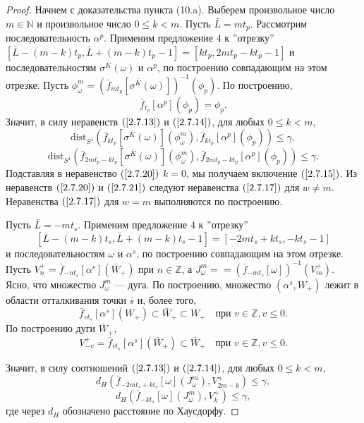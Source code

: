 \documentclass[12pt]{article}
\begin{document}
\begin{proof}
Начнем с доказательства пункта (10.a).
Выберем произвольное число $m\in\mathbb{N}$ и произвольное число $0\leq k< m$.
Пусть $\bar{L}=mt_p$.
Рассмотрим последовательность $\alpha^p$.  Применим предложение 4 к ''отрезку'' $[\bar{L}-(m-k)t_p,\bar{L}+(m-k)t_p-1]=[kt_p,2mt_p-kt_p-1]$ и последовательностям $\sigma^{\bar{K}}(\omega)$ и $\alpha^p$, по построению совпадающим на этом отрезке. Пусть $\phi^m_{\omega}=(\bar{f}_{mt_p}[\sigma^{\bar{K}}(\omega)])^{-1}(\phi_p)$. 
По построению,
$$\bar{f}_{t_p}[\alpha^p](\phi_p)=\phi_p.$$
Значит, в силу неравенств $(\ref{2.7.13})$ и $(\ref{2.7.14})$, для любых $0\leq k< m$,
\begin{equation}
\label{2.7.20}
\mbox{dist}_{S^1}(\bar{f}_{kt_p}[\sigma^{\bar{K}}(\omega)](\phi^m_{\omega}),\bar{f}_{kt_p}[\alpha^p](\phi_p))\leq\gamma,
\end{equation}
\begin{equation}
\label{2.7.21}
\mbox{dist}_{S^1}(\bar{f}_{2mt_p-kt_p}[\sigma^{\bar{K}}(\omega)](\phi^m_{\omega}),\bar{f}_{2mt_p-kt_p}[\alpha^p](\phi_p))\leq\gamma.
\end{equation}
Подставляя в неравенство $(\ref{2.7.20})$ $k=0$, мы получаем включение $(\ref{2.7.15})$.
Из неравенств $(\ref{2.7.20})$ и $(\ref{2.7.21})$ следуют неравенства $(\ref{2.7.17})$ для $w\neq m$. Неравенства $(\ref{2.7.17})$ для $w=m$ выполняются по построению.

Пусть $\bar{L}=-mt_s$.
Применим предложение 4 к ''отрезку'' $$[\bar{L}-(m-k)t_s,\bar{L}+(m-k)t_s-1]=[-2mt_s+kt_s,-kt_s-1]$$ и последовательностям $\omega$ и $\alpha^s$, по построению совпадающим на этом отрезке.
Пусть $V^+_n=\bar{f}_{-nt_s}[\alpha^s](\bar{W}_+)$ при $n\in\mathbb{Z}$, а $J^m_{\omega}=\allowbreak=(\bar{f}_{-mt_s}[\omega])^{-1}(V^+_m)$. Ясно, что множество $J^m_{\omega}$ --- дуга. По построению, множество $(\alpha^s,W_+)$ лежит в области отталкивания точки $\bar{s}$ и, более того,
$$\bar{f}_{vt_s}[\alpha^s](W_+)\subset \bar{W}_+\subset W_+\quad\textrm{при } v\in\mathbb{Z},v\leq0.$$
По построению дуги $\bar{W}_+$,
$$V^+_{-v}=\bar{f}_{vt_s}[\alpha^s](\bar{W}_+)\subset \bar{W}_+\quad\textrm{при } v\in\mathbb{Z},v\leq0.$$

Значит, в силу соотношений $(\ref{2.7.13})$ и $(\ref{2.7.14})$, для любых $0\leq k< m$,
\begin{equation}
\label{2.7.22}
d_{H}(\bar{f}_{-2mt_s+kt_s}[\omega](J^m_{\omega}),V^+_{2m-k})\leq\gamma,
\end{equation}
\begin{equation}
\label{2.7.23}
d_{H}(\bar{f}_{-kt_s}[\omega](J^m_{\omega}),V^+_k)\leq\gamma,
\end{equation}
где через $d_H$ обозначено расстояние по Хаусдорфу.  


\end{proof}
\end{document}
